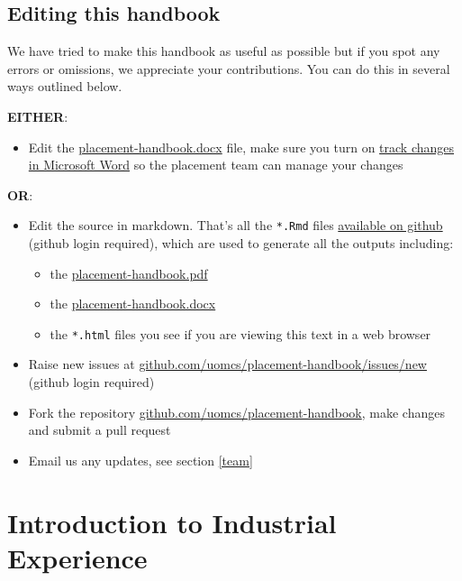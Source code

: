 \documentclass[
]{book}
\providecommand{\tightlist}{%
  \setlength{\itemsep}{0pt}\setlength{\parskip}{0pt}}
\begin{document}
\section{Editing this handbook}\label{edit}

We have tried to make this handbook as useful as possible but if you spot any errors or omissions, we appreciate your contributions. You can do this in several ways outlined below.

\textbf{EITHER}:

\begin{itemize}
\tightlist
\item
  Edit the \url{placement-handbook.docx} file, make sure you turn on \href{https://support.microsoft.com/en-gb/office/track-changes-in-word-197ba630-0f5f-4a8e-9a77-3712475e806a}{track changes in Microsoft Word} so the placement team can manage your changes
\end{itemize}

\textbf{OR}:

\begin{itemize}
\tightlist
\item
  Edit the source in markdown. That's all the \texttt{*.Rmd} files \href{https://github.com/search?q=repo\%3AUoMCS\%2Fplacement-handbook++language\%3ARMarkdown&type=code}{available on github} (github login required), which are used to generate all the outputs including:

  \begin{itemize}
  \tightlist
  \item
    the \url{placement-handbook.pdf}
  \item
    the \url{placement-handbook.docx}
  \item
    the \texttt{*.html} files you see if you are viewing this text in a web browser
  \end{itemize}
\item
  Raise new issues at \href{https://github.com/uomcs/placement-handbook/issues/new}{github.com/uomcs/placement-handbook/issues/new} (github login required)
\item
  Fork the repository \href{https://github.com/uomcs/placement-handbook}{github.com/uomcs/placement-handbook}, make changes and submit a pull request
\item
  Email us any updates, see section \ref{team}
\end{itemize}

\chapter{Introduction to Industrial Experience}\label{intro}
\end{document}
